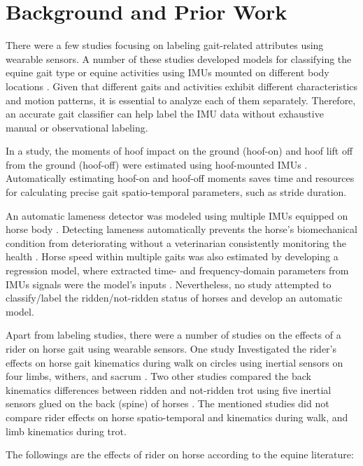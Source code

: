 \section{Background and Prior Work}
\label{sec:background}

There were a few studies focusing on labeling gait-related attributes using wearable sensors. A number of these studies developed models for classifying the equine gait type or equine activities using IMUs mounted on different body locations \cite{articllstm,eerdekens_2020_automatic}. Given that different gaits and activities exhibit different characteristics and motion patterns, it is essential to analyze each of them separately. Therefore, an accurate gait classifier can help label the IMU data without exhaustive manual or observational labeling. 

In a study, the moments of hoof impact on the ground (hoof-on) and hoof lift off from the ground (hoof-off) were estimated using hoof-mounted IMUs \cite{tijssen_2020_automatic}. Automatically estimating hoof-on and hoof-off moments saves time and resources for calculating precise gait spatio-temporal parameters, such as stride duration. 

An automatic lameness detector was modeled using multiple IMUs equipped on horse body \cite{9216873}. Detecting lameness automatically prevents the horse's biomechanical condition from deteriorating without a veterinarian consistently monitoring the health \cite{9216873}. Horse speed within multiple gaits was also estimated by developing a regression model, where extracted time- and frequency-domain parameters from IMUs signals were the model’s inputs \cite{darbandi_2021_using}. Nevertheless, no study attempted to classify/label the ridden/not-ridden status of horses and develop an automatic model. 

Apart from labeling studies, there were a number of studies on the effects of a rider on horse gait using wearable sensors. One study Investigated the rider’s effects on horse gait kinematics during walk on circles using inertial sensors on four limbs, withers, and sacrum \cite{clarkcarter_2014_z}. Two other studies compared the back kinematics differences between ridden and not-ridden trot using five inertial sensors glued on the back (spine) of horses \cite{hayati_2019_analysis,Barrey1999MethodsHorses}. The mentioned studies did not compare rider effects on horse spatio-temporal and kinematics during walk, and limb kinematics during trot. 

The followings are the effects of rider on horse according to the equine literature:

